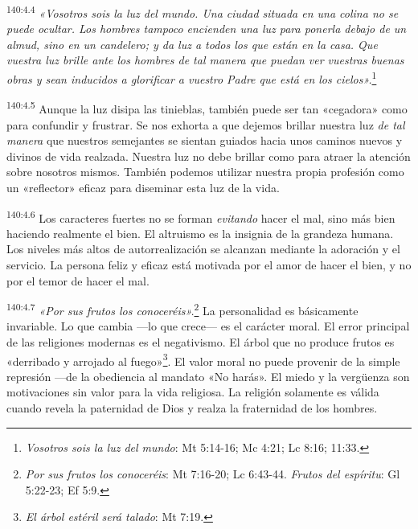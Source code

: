\par 
\textsuperscript{140:4.4} \textit{«Vosotros sois la luz del mundo. Una ciudad situada en una colina no se puede ocultar. Los hombres tampoco encienden una luz para ponerla debajo de un almud, sino en un candelero; y da luz a todos los que están en la casa. Que vuestra luz brille ante los hombres de tal manera que puedan ver vuestras buenas obras y sean inducidos a glorificar a vuestro Padre que está en los cielos».}\footnote{\textit{Vosotros sois la luz del mundo}: Mt 5:14-16; Mc 4:21; Lc 8:16; 11:33.}

\par 
\textsuperscript{140:4.5} Aunque la luz disipa las tinieblas, también puede ser tan «cegadora» como para confundir y frustrar. Se nos exhorta a que dejemos brillar nuestra luz \textit{de tal manera} que nuestros semejantes se sientan guiados hacia unos caminos nuevos y divinos de vida realzada. Nuestra luz no debe brillar como para atraer la atención sobre nosotros mismos. También podemos utilizar nuestra propia profesión como un «reflector» eficaz para diseminar esta luz de la vida.

\par 
\textsuperscript{140:4.6} Los caracteres fuertes no se forman \textit{evitando} hacer el mal, sino más bien haciendo realmente el bien. El altruismo es la insignia de la grandeza humana. Los niveles más altos de autorrealización se alcanzan mediante la adoración y el servicio. La persona feliz y eficaz está motivada por el amor de hacer el bien, y no por el temor de hacer el mal.

\par 
\textsuperscript{140:4.7} \textit{«Por sus frutos los conoceréis».}\footnote{\textit{Por sus frutos los conoceréis}: Mt 7:16-20; Lc 6:43-44. \textit{Frutos del espíritu}: Gl 5:22-23; Ef 5:9.} La personalidad es básicamente invariable. Lo que cambia ---lo que crece--- es el carácter moral. El error principal de las religiones modernas es el negativismo. El árbol que no produce frutos es «derribado y arrojado al fuego»\footnote{\textit{El árbol estéril será talado}: Mt 7:19.}. El valor moral no puede provenir de la simple represión ---de la obediencia al mandato «No harás». El miedo y la verg\"uenza son motivaciones sin valor para la vida religiosa. La religión solamente es válida cuando revela la paternidad de Dios y realza la fraternidad de los hombres.

